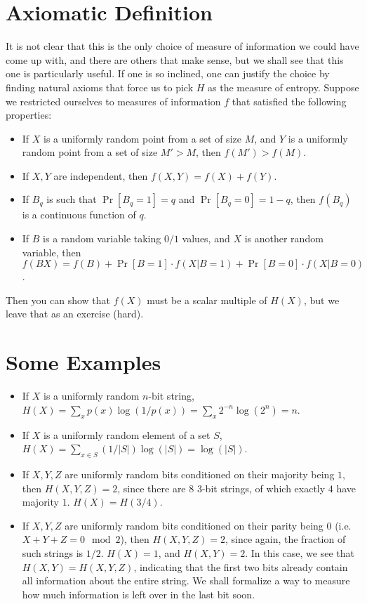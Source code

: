 \documentclass[10pt]{article}
\begin{document}
\section{Axiomatic Definition}

It is not clear that this is the only choice of measure of information we could have come up with, and there are others that make sense, but we shall see that this one is particularly useful. If one is so inclined, one can justify the choice by finding natural axioms that force us to pick $H$ as the measure of entropy. Suppose we restricted ourselves to measures of information $f$ that satisfied the following properties:

\begin{itemize}
	\item If $X$ is a uniformly random point from a set of size $M$, and $Y$ is a uniformly random point from a set of size $M' > M$, then $f(M')> f(M)$.
	\item If $X,Y$ are independent, then $f(X,Y) = f(X) + f(Y)$.
	\item If $B_q$ is such that $\Pr[B_q = 1]=q$ and $\Pr[B_q = 0] = 1-q$, then $f(B_q)$ is a continuous function of $q$. 
	\item If $B$ is a random variable taking $0/1$ values, and $X$ is another random variable, then $f(BX) = f(B) + \Pr[B=1] \cdot f(X|B=1) + \Pr[B=0] \cdot f(X|B=0)$.
\end{itemize}

Then you can show that $f(X)$ must be a scalar multiple of $H(X)$, but we leave that as an exercise (hard). 

\section{Some Examples}

\begin{itemize}
	\item If $X$ is a uniformly random $n$-bit string, $H(X) = \sum_{x} p(x) \log (1/p(x)) = \sum_x 2^{-n} \log (2^n) = n$.
	\item If $X$ is a uniformly random element of a set $S$, $H(X) = \sum_{x \in S} (1/|S|) \log (|S|) = \log(|S|)$.
	\item If $X,Y,Z$ are uniformly random bits conditioned on their majority being $1$, then $H(X,Y,Z) = 2$, since there are $8$ $3$-bit strings, of which exactly $4$ have majority $1$. $H(X) = H(3/4)$.
	\item If $X,Y,Z$ are uniformly random bits conditioned on their parity being $0$ (i.e.\ $X+Y+Z = 0 \mod 2$), then $H(X,Y,Z) = 2$, since again, the fraction of such strings is $1/2$. $H(X) = 1$, and $H(X,Y) = 2$. In this case, we see that $H(X,Y) = H(X,Y,Z)$, indicating that the first two bits already contain all information about the entire string. We shall formalize a way to measure how much information is left over in the last bit soon.
\end{itemize}
\end{document}
